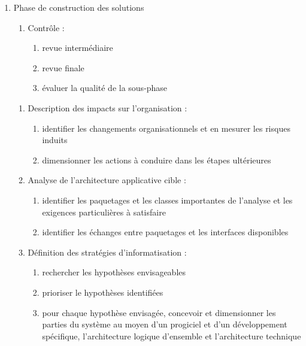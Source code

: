 \begin{enumerate}
    \item Phase de construction des solutions
          \begin{enumerate}
            \item Contrôle :
                \begin{enumerate}
                  \item revue intermédiaire
                  \item revue finale
                  \item évaluer la qualité de la sous-phase
                \end{enumerate}
          \end{enumerate}

          \begin{enumerate}
            \item Description des impacts sur l'organisation : 
                \begin{enumerate}
                  \item identifier les changements organisationnels et en mesurer les risques induits
                  \item dimensionner les actions à conduire dans les étapes ultérieures
                \end{enumerate}
            \item Analyse de l'architecture applicative cible : 
                \begin{enumerate}
                  \item identifier les paquetages et les classes importantes de l'analyse et les exigences particulières à satisfaire 
                  \item identifier les échanges entre paquetages et les interfaces disponibles 
                \end{enumerate}
            \item Définition des stratégies d'informatisation : 
                \begin{enumerate}
                  \item rechercher les hypothèses envisageables 
                  \item prioriser le hypothèses identifiées
                  \item pour chaque hypothèse envisagée, concevoir et dimensionner les parties du système au moyen d'un progiciel et d'un développement spécifique, l'architecture logique d'ensemble et l'architecture technique
                \end{enumerate}

\end{enumerate}
\end{enumerate}
